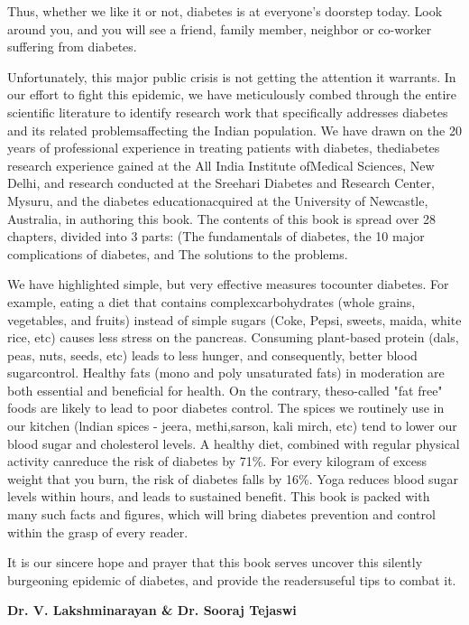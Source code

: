Thus, whether we like it or not, diabetes is at everyone's doorstep today. Look around you, and you will see a friend, family member, neighbor or co-worker suffering from diabetes.

Unfortunately, this major public crisis is not getting the attention it warrants. In our effort to fight this epidemic, we have meticulously combed through the entire scientific literature to identify research work that specifically addresses diabetes and its related problems\break affecting the Indian population. We have drawn on the 20 years of professional experience in treating patients with diabetes, the\break diabetes research experience gained at the All India Institute of\break Medical Sciences, New Delhi, and research conducted at the Sreehari Diabetes and Research Center, Mysuru, and the diabetes education\break acquired at the University of Newcastle, Australia, in authoring this book. The contents of this book is spread over 28 chapters, divided into 3 parts: (The fundamentals of diabetes, the 10 major complications of diabetes, and The solutions to the problems.

We have highlighted simple, but very effective measures to\break counter diabetes. For example, eating a diet that contains complex\break carbohydrates (whole grains, vegetables, and fruits) instead of simple sugars (Coke, Pepsi, sweets, maida, white rice, etc) causes less stress on the pancreas. Consuming plant-based protein (dals, peas, nuts, seeds, etc) leads to less hunger, and consequently, better blood sugar\break control. Healthy fats (mono and poly unsaturated fats) in moderation are both essential and beneficial for health. On the contrary, the\break so-called "fat free" foods are likely to lead to poor diabetes control. The spices we routinely use in our kitchen (lndian spices - jeera, methi,\break sarson, kali mirch, etc) tend to lower our blood sugar and cholesterol levels. A healthy diet, combined with regular physical activity can\break reduce the risk of diabetes by 71\%. For every kilogram of excess weight that you burn, the risk of diabetes falls by 16\%. Yoga reduces blood sugar levels within hours, and leads to sustained benefit. This book is packed with many such facts and figures, which will bring diabetes prevention and control within the grasp of every reader.

It is our sincere hope and prayer that this book serves uncover this silently burgeoning epidemic of diabetes, and provide the readers\break useful tips to combat it.

\begin{flushright}
\textbf{Dr. V. Lakshminarayan \& Dr. Sooraj Tejaswi}
\end{flushright}


\newpage
~\phantom{a}
\thispagestyle{empty}
\newpage
